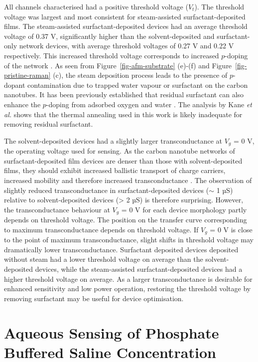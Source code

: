 \documentclass[
  a4paper,
]{scrbook}
\begin{document}
All channels characterised had a positive threshold voltage (\(V_{t}\)).
The threshold voltage was largest and most consistent for steam-assisted
surfactant-deposited films. The steam-assisted surfactant-deposited
devices had an average threshold voltage of 0.37 V, significantly higher
than the solvent-deposited and surfactant-only network devices, with
average threshold voltages of 0.27 V and 0.22 V respectively. This
increased threshold voltage corresponds to increased \(p\)-doping of the
network \autocite{Kang2005,Heller2008,Murugathas2018}. As seen from
Figure~\ref{fig-afm-substrate} (e)-(f) and
Figure~\ref{fig-pristine-raman} (c), the steam deposition process leads
to the presence of \(p\)-dopant contamination due to trapped water
vapour or surfactant on the carbon nanotubes. It has been previously
established that residual surfactant can also enhance the \(p\)-doping
from adsorbed oxygen and water
\autocite{Kane2014,Nonoguchi2018,Christensen2022}. The analysis by Kane
\emph{et al.} shows that the thermal annealing used in this work is
likely inadequate for removing residual surfactant.

The solvent-deposited devices had a slightly larger transconductance at
\(V_g\) = 0 V, the operating voltage used for sensing. As the carbon
nanotube networks of surfactant-deposited film devices are denser than
those with solvent-deposited films, they should exhibit increased
ballistic transport of charge carriers, increased mobility and therefore
increased transconductance \autocite{Rouhi2011}. The observation of
slightly reduced transconductance in surfactant-deposited devices
(\(\sim\) 1 µS) relative to solvent-deposited devices (\textgreater{} 2
µS) is therefore surprising. However, the transconductance behaviour at
\(V_g\) = 0 V for each device morphology partly depends on threshold
voltage. The position on the transfer curve corresponding to maximum
transconductance depends on threshold voltage. If \(V_g\) = 0 V is close
to the point of maximum transconductance, slight shifts in threshold
voltage may dramatically lower transconductance. Surfactant deposited
devices deposited without steam had a lower threshold voltage on average
than the solvent-deposited devices, while the steam-assisted
surfactant-deposited devices had a higher threshold voltage on average.
As a larger transconductance is desirable for enhanced sensitivity and
low power operation, restoring the threshold voltage by removing
surfactant may be useful for device optimisation.

\hypertarget{sec-dummy-sensing}{%
\section{Aqueous Sensing of Phosphate Buffered Saline
Concentration}\label{sec-dummy-sensing}}
\end{document}
